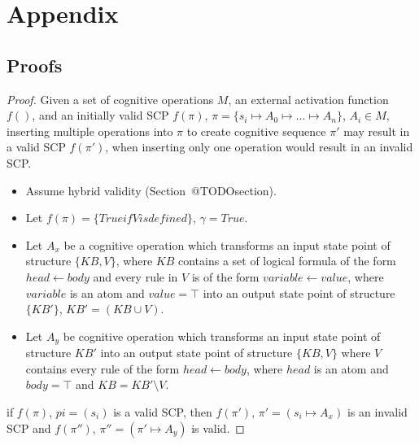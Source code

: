 \chapter*{Appendix} \label{chp:appendix}
\section{Proofs}
\begin{proof} \label{proof:insertionSearch}
Given a set of cognitive operations $M$, an external activation function $f()$, and an initially valid SCP $f(\pi)$, $\pi=\{s_i \longmapsto A_0 \longmapsto ... \longmapsto A_n\}$, $A_i \in M$, inserting multiple operations into $\pi$ to create cognitive sequence $\pi'$ may result in a valid SCP $f(\pi')$, when inserting only one operation would result in an invalid SCP.

\begin{itemize}
\item Assume hybrid validity (Section~@TODOsection).
\item Let $f(\pi)=\{True if V is defined\}$, $\gamma = True$.
\item Let $A_x$ be a cognitive operation which transforms an input state point of structure $\{KB, V\}$, where $KB$ contains a set of logical formula of the form $head \leftarrow body$ and every rule in $V$ is of the form $variable \leftarrow value$, where $variable$ is an atom and  $value=\top$ into an output state point of structure $\{KB'\}$, $KB'=(KB \cup V)$.
\item Let $A_y$ be cognitive operation which transforms an input state point of structure $KB'$ into an output state point of structure $\{KB, V\}$ where $V$ contains every rule of the form $head \leftarrow body$, where $head$ is an atom and $body=\top$ and $KB= KB' \setminus V$.
\end{itemize}
\item if $f(\pi)$, $pi=(s_i)$ is a valid SCP, then $f(\pi')$, $\pi'=(s_i\longmapsto A_x)$ is an invalid SCP and $f(\pi'')$, $\pi''=(\pi'\longmapsto A_y)$ is valid.
\end{proof}

